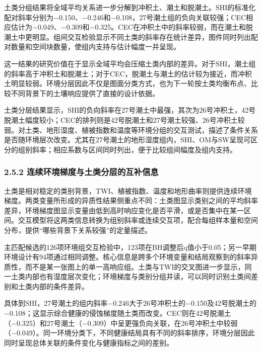 \documentclass[
  11pt,
  a4paper,
]{ctexart}
\begin{document}
土类分组结果将全域平均关系进一步分解到冲积土、潮土和脱潮土。SHI的标准化配对斜率分别为−0.150、−0.246和−0.108，27号潮土组的负向关联较强；CEC相应估计为−0.049、−0.309和−0.325。CEC在冲积土中的斜率较弱，而在潮土和脱潮土中更明显。组间交互检验显示不同土类的斜率存在统计差异，图件同时列出配对数量和空间块数量，使组内支持与估计幅度一并呈现。

这一结果的研究价值在于显示全域平均会压缩土类内部的差异。对于SHI，潮土组的斜率高于冲积土和脱潮土；对于CEC，脱潮土与潮土的估计较为接近，而冲积土明显较弱。环境分层因此不仅是图面分类方式，也为下一轮按土类均衡布点、比较不同背景下的土壤响应提供了直接的设计依据。

土类分层结果显示，SHI的负向斜率在27号潮土中最强，其次为26号冲积土，42号脱潮土幅度较小；CEC的排列则是42号脱潮土和27号潮土较强、26号冲积土较弱。对土类、地形湿度、植被指数和温度等环境分组的交互测试，描述了条件关系是否随环境层次改变。尤其在27号潮土的地形湿度组内，SHI、OM与SW呈现可区分的组别斜率；相应系数与区间同时列出，便于比较组间幅度及组内支持。

\hypertarget{ux8fdeux7eedux73afux5883ux68afux5ea6ux4e0eux571fux7c7bux5206ux5c42ux7684ux4e92ux8865ux4fe1ux606f}{%
\subsubsection{2.5.2
连续环境梯度与土类分层的互补信息}\label{ux8fdeux7eedux73afux5883ux68afux5ea6ux4e0eux571fux7c7bux5206ux5c42ux7684ux4e92ux8865ux4fe1ux606f}}

土类是相对稳定的类别背景，TWI、植被指数、温度和地形曲率则提供连续环境梯度。两类变量所形成的异质性结果侧重点不同：土类图显示类别之间的平均斜率差异，环境梯度图显示变量由低到高时响应变化是否平滑，或是否集中在某一区间。交互模型将这两类信息转换为组别斜率或连续交互项，配合每组样本量和空间分布，提供``哪些背景下关系较强''的定量描述。

主匹配候选的126项环境组交互检验中，123项在BH调整后q值小于0.05；另一早期环境设计有94项通过相同调整。核心信息是跨多个环境变量和结局观察到的斜率异质性，而不是某一张图上的单一高响应组。土类与TWI的交叉图进一步显示，同一土类内部也有湿度层次变化；环境梯度与类别分组并读，可以同时识别土类间差别和土类内部的条件差异。

具体到SHI，27号潮土的组内斜率−0.246大于26号冲积土的−0.150及42号脱潮土的−0.108；这显示综合健康的侵蚀梯度随土类而改变。CEC则在42号脱潮土（−0.325）和27号潮土（−0.309）中呈更强负向关联，在26号冲积土中较弱（−0.049）。同一环境分类下，不同健康结局具有不同的斜率排序，环境分层因此同时呈现总体关联的条件变化与健康指标之间的差别。
\end{document}
